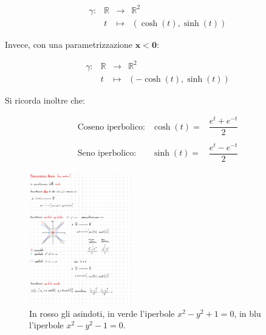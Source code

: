 \documentclass[a4paper]{article}
\begin{document}
	\begin{equation*}
		\begin{array}{llll}
			\gamma: & \mathbb{R} & \longrightarrow & \mathbb{R}^{2} \\
					& t			 & \longmapsto	   & \left(\cosh\left(t\right), \sinh\left(t\right)\right)
		\end{array}
	\end{equation*}

	\noindent
	Invece, con una parametrizzazione $\boldsymbol{x < 0}$:
	
	\begin{equation*}
		\begin{array}{llll}
			\gamma: & \mathbb{R} & \longrightarrow & \mathbb{R}^{2} \\
					& t			 & \longmapsto	   & \left(- \cosh\left(t\right), \sinh\left(t\right)\right)
		\end{array}
	\end{equation*}

	\noindent
	Si ricorda inoltre che:
	
	\begin{equation*}
		\begin{array}{lll}
			\text{Coseno iperbolico:}	& \cosh\left(t\right) =	& \dfrac{e^{t} + e^{-t}}{2} \\
			\\
			\text{Seno iperbolico:}		& \sinh\left(t\right) =	& \dfrac{e^{t} - e^{-t}}{2}
		\end{array}
	\end{equation*}

	\begin{figure}[!htp]
		\centering
		\includegraphics[width=0.4\textwidth]{img/iperbole_equilatera.pdf}
		\caption{In rosso gli asindoti, in verde l'iperbole $x^{2} - y^{2} + 1 = 0$, in blu l'iperbole $x^{2} - y^{2} - 1 = 0$.}
	\end{figure}
\end{document}
